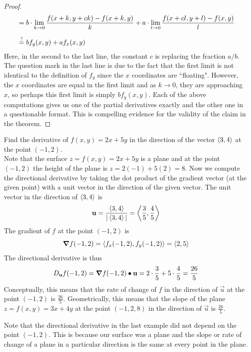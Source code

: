 \documentclass[handout]{ximera}
\begin{document}
\begin{proof}
\begin{align*}
                  &= b\cdot \lim_{k \to 0} \frac{f(x + k, y + ck) - f(x+k , y)}{k} + 
                  a\cdot \lim_{l \to 0} \frac{f(x+ cl , y+ l) -f(x,y)}{l} \\[6pt]
                  &\overset{\scriptsize\text{?}}{=}  b f_y(x,y) + af_x(x,y)
\end{align*}
Here, in the second to the last line, the constant $c$ is replacing the fraction $a/b$.  
The question mark in the last line is due to the fact that the first limit is not
identical to the definition of $f_y$ since the $x$ coordinates are ``floating".  
However, the $x$ coordinates are equal in the first limit and as $k \to 0$, 
they are approaching $x$, 
so perhaps this first limit is simply $bf_y(x,y)$.
Each of the above computations gives us one of the partial derivatives exactly 
and the other one in a questionable format. 
This is compelling evidence for the validity of the claim in the theorem.
\end{proof}


\begin{example}[Example 4]
Find the derivative of $f(x,y) = 2x + 5y$ in the direction of the 
vector $\left\langle 3,4\right\rangle$ at the point $(-1, 2)$.\\
Note that the surface $z = f(x,y) = 2x + 5y$ is a plane and at the 
point $(-1, 2)$ the height of the plane is $z = 2(-1) + 5(2) = 8$.
Now we compute the directional derivative by taking the dot product of the 
gradient vector (at the given point) with a unit 
vector in the direction of the given vector.
The unit vector in the direction of $\left\langle 3,4\right\rangle$ is
\[
\mathbf u = \frac{\left\langle 3,4\right\rangle}{|\left\langle 3,4\right\rangle|} = \left\langle \frac35, \frac45\right\rangle
\]
The gradient of $f$ at the point $(-1, 2)$ is
\[
\boldsymbol\nabla f(-1, 2) = \left\langle f_x(-1,2), f_y(-1,2)\right\rangle = \left\langle 2,5\right\rangle
\]
The directional derivative is thus
\[
D_{\mathbf u} f (-1, 2) = \boldsymbol\nabla f(-1, 2) \bullet \mathbf u = 
2 \cdot \frac35 + 5 \cdot \frac45 = \frac{26}{5}
\]
Conceptually, this means that the rate of change of $f$ in the direction 
of $\vec u$ at the point $(-1, 2)$ is $\frac{26}{5}$.
Geometrically, this means that the slope of the plane $z = f(x,y) = 3x + 4y$ at the 
point $(-1, 2, 8)$ in the direction of $\vec u$ is $\frac{26}{5}$.
\end{example}

\begin{remark}
Note that the directional derivative in the last example did not depend 
on the point $(-1, 2)$.  
This is because our surface was a plane and the slope or rate of change 
of a plane in a particular 
direction is the same at every point in the plane.
\end{remark}
\end{document}
